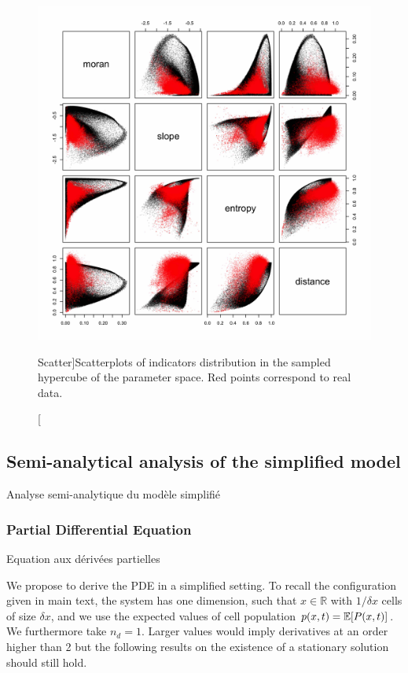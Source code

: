 \begin{figure}
\includegraphics[width=\textwidth]{Figures/Density/scatter}
\caption[Scatter][Scatter]{Scatterplots of indicators distribution in the sampled hypercube of the parameter space. Red points correspond to real data.}{}
\label{fig:densityscatter}
\end{figure}





\subsection{Semi-analytical analysis of the simplified model}{Analyse semi-analytique du modèle simplifié}


\subsubsection{Partial Differential Equation}{Equation aux dérivées partielles}

We propose to derive the PDE in a simplified setting. To recall the configuration given in main text, the system has one dimension, such that $x\in \mathbb{R}$ with $1/\delta x$ cells of size $\delta x$, and we use the expected values of cell population $p(x,t) = \operatorname{\mathbb{E}}\!\left[P(x,t)\right]$. We furthermore take $n_d=1$. Larger values would imply derivatives at an order higher than 2 but the following results on the existence of a stationary solution should still hold. 

